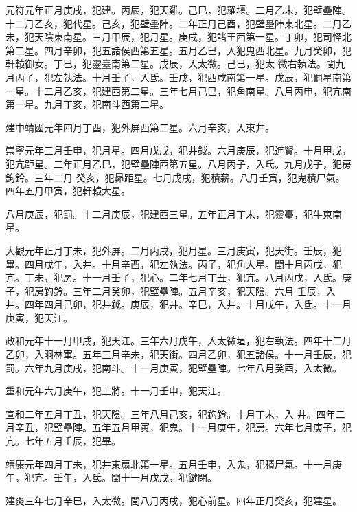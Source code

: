 \begin{pinyinscope}
 元符元年正月庚戌，犯建。丙辰，犯天雞。己巳，犯羅堰。二月乙未，犯壁壘陣。十二月乙亥，犯代星。己亥，犯壁壘陣。二年正月己酉，犯壁壘陣東北星。二月乙未，犯天陰東南星。三月甲辰，犯月星。庚戌，犯諸王西第一星。丁卯，犯司怪北第二星。四月辛卯，犯五諸侯西第五星。五月乙巳，入犯鬼西北星。九月癸卯，犯軒轅御女。丁巳，犯靈臺南第二星。戊辰，入太微。己巳，犯太
 微右執法。閏九月丙子，犯左執法。十月壬子，入氐。壬戌，犯西咸南第一星。戊辰，犯罰星南第一星。十二月乙亥，犯建西第二星。三年七月己巳，犯角南星。八月丙申，犯亢南第一星。九月丁亥，犯南斗西第二星。



 建中靖國元年四月丁酉，犯外屏西第二星。六月辛亥，入東井。



 崇寧元年三月壬申，犯月星。四月戊戌，犯井鉞。六月庚辰，犯進賢。十月甲戌，犯亢距星。二年正月乙巳，犯壁壘陣西第五星。八月丙子，入氐。九月戊子，犯房鉤鈐。三年二月
 癸亥，犯昴距星。七月戊戌，犯積薪。八月壬寅，犯鬼積尸氣。四年五月甲寅，犯軒轅大星。



 八月庚辰，犯罰。十二月庚辰，犯建西三星。五年正月丁未，犯靈臺，犯牛東南星。



 大觀元年正月丁未，犯外屏。二月丙戌，犯月星。三月庚寅，犯天街。壬辰，犯畢。四月戊午，入井。十月辛酉，犯左執法。丙子，犯角大星。閏十月丙戌，犯亢。丁未，犯房。十一月壬子，犯心。二年七月丁丑，犯亢。八月丙戌，入氐。庚子，犯房鉤鈐。三年二月癸卯，犯壁壘陣。五月辛亥，犯天陰。六月
 壬辰，入井。四年四月己卯，犯井鉞。庚辰，犯井。辛巳，入井。十月戊午，入氐。十一月庚寅，犯天江。



 政和元年十一月甲戌，犯天江。三年六月戊午，入太微垣，犯右執法。四年十二月乙卯，入羽林軍。五年三月辛未，犯天街。四月乙卯，犯五諸侯。十一月壬辰，犯罰。六年九月庚戌，犯南斗。十一月庚寅，犯壁壘陣。七年八月癸酉，入太微。



 重和元年六月庚午，犯上將。十一月壬申，犯天江。



 宣和二年五月丁丑，犯天陰。三年八月己亥，犯鉤鈐。十月丁未，入
 井。四年二月辛丑，犯壁壘陣。五年五月甲寅，犯鬼。十一月庚午，犯房。六年七月庚子，犯亢。七年五月壬辰，犯畢。



 靖康元年四月丁未，犯井東扇北第一星。五月壬申，入鬼，犯積尸氣。十一月庚午，犯亢。壬午，入氐。閏十一月戊戌，犯鍵閉。



 建炎三年七月辛巳，入太微。閏八月丙戌，犯心前星。四年正月癸亥，犯建星。




\end{pinyinscope}
